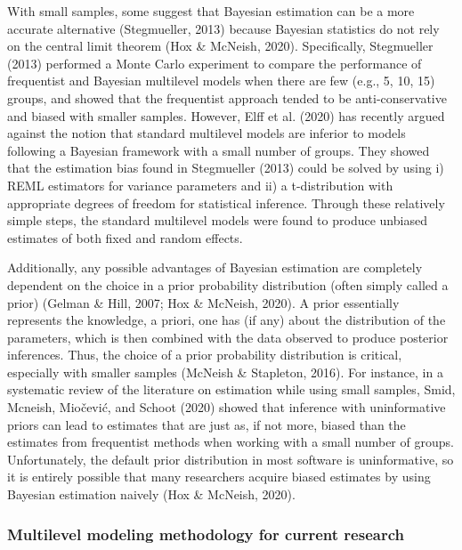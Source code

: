 \documentclass[
  english,
  man, noextraspace,floatsintext]{apa6}
\begin{document}
With small samples, some suggest that Bayesian estimation can be a more accurate alternative (Stegmueller, 2013) because Bayesian statistics do not rely on the central limit theorem (Hox \& McNeish, 2020). Specifically, Stegmueller (2013) performed a Monte Carlo experiment to compare the performance of frequentist and Bayesian multilevel models when there are few (e.g., 5, 10, 15) groups, and showed that the frequentist approach tended to be anti-conservative and biased with smaller samples. However, Elff et al. (2020) has recently argued against the notion that standard multilevel models are inferior to models following a Bayesian framework with a small number of groups. They showed that the estimation bias found in Stegmueller (2013) could be solved by using i) REML estimators for variance parameters and ii) a t-distribution with appropriate degrees of freedom for statistical inference. Through these relatively simple steps, the standard multilevel models were found to produce unbiased estimates of both fixed and random effects.

Additionally, any possible advantages of Bayesian estimation are completely dependent on the choice in a prior probability distribution (often simply called a prior) (Gelman \& Hill, 2007; Hox \& McNeish, 2020). A prior essentially represents the knowledge, a priori, one has (if any) about the distribution of the parameters, which is then combined with the data observed to produce posterior inferences. Thus, the choice of a prior probability distribution is critical, especially with smaller samples (McNeish \& Stapleton, 2016). For instance, in a systematic review of the literature on estimation while using small samples, Smid, Mcneish, Miočević, and Schoot (2020) showed that inference with uninformative priors can lead to estimates that are just as, if not more, biased than the estimates from frequentist methods when working with a small number of groups. Unfortunately, the default prior distribution in most software is uninformative, so it is entirely possible that many researchers acquire biased estimates by using Bayesian estimation naively (Hox \& McNeish, 2020).

\hypertarget{multilevel-modeling-methodology-for-current-research}{%
\subsubsection{Multilevel modeling methodology for current research}\label{multilevel-modeling-methodology-for-current-research}}
\end{document}

